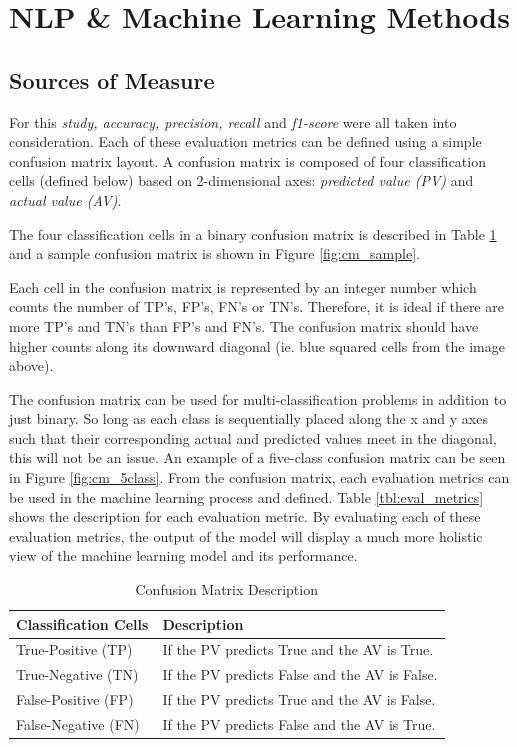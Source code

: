 \documentclass[12pt]{article}
\begin{document}
\section{NLP \& Machine Learning Methods}
\subsection{Sources of Measure}

For this \textit{study, accuracy, precision, recall} and \textit{f1-score} were all taken into consideration. Each of these evaluation metrics can be defined using a simple confusion matrix layout.  A confusion matrix is composed of four classification cells (defined below) based on 2-dimensional axes: \textit{predicted value (PV)} and \textit{actual value (AV)}. 

The four classification cells in a binary confusion matrix is described in Table \ref{tbl:cm_desc} and a sample confusion matrix is shown in Figure \ref{fig:cm_sample}.

Each cell in the confusion matrix is represented by an integer number which counts the number of TP’s, FP’s, FN’s or TN’s.  Therefore, it is ideal if there are more TP’s and TN’s than FP’s and FN’s.  The confusion matrix should have higher counts along its downward diagonal (ie. blue squared cells from the image above).

The confusion matrix can be used for multi-classification problems in addition to just binary.  So long as each class is sequentially placed along the x and y axes such that their corresponding actual and predicted values meet in the diagonal, this will not be an issue.  An example of a five-class confusion matrix can be seen in Figure \ref{fig:cm_5class}. From the confusion matrix, each evaluation metrics can be used in the machine learning process and defined. Table \ref{tbl:eval_metrics} shows the description for each evaluation metric. By evaluating each of these evaluation metrics, the output of the model will display a much more holistic view of the machine learning model and its performance. 



\begin{table}[tbp]
\centering
\begin{tabularx}{\linewidth}{ l X}
\toprule
   Classification Cells & Description \\
\midrule

True-Positive (TP) & If the PV predicts True and the AV is True.\\
True-Negative (TN) & If the PV predicts False and the AV is False.\\
False-Positive (FP) & If the PV predicts True and the AV is False.\\
False-Negative (FN) & If the PV predicts False and the AV is True.\\

\bottomrule
\end{tabularx}
\caption{Confusion Matrix Description}
\label{tbl:cm_desc}
\end{table}
\end{document}

